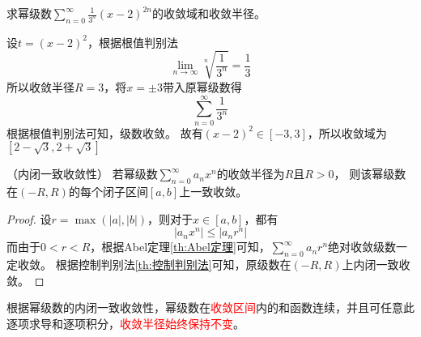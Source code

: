 \begin{example}
    求幂级数$\displaystyle \sum_{n=0}^\infty \frac{1}{3^n}(x-2)^{2n}$的收敛域和收敛半径。
\end{example}
\begin{solution}
    设$t=(x-2)^2$，根据根值判别法
    \[ \lim_{n\to\infty} \sqrt[n]{\frac{1}{3^n}}=\frac{1}{3} \]
    所以收敛半径$R=3$，将$x =\pm 3$带入原幂级数得
    \[ \sum_{n=0}^\infty \frac{1}{3^n} \]
    根据根值判别法可知，级数收敛。
    故有$(x-2)^2 \in [-3,3]$，所以收敛域为$[2-\sqrt{3},2+\sqrt{3}]$
\end{solution}

\begin{theorem}
    （内闭一致收敛性）
    \label{th:内闭一致收敛性}
    若幂级数$\displaystyle\sum_{n=0}^\infty a_nx^n$的收敛半径为$R$且$R>0$，
    则该幂级数在$(-R,R)$的每个闭子区间$[a,b]$上一致收敛。
\end{theorem}
\begin{proof}
    设$r=\max(|a|,|b|)$，则对于$x\in[a,b]$，都有
    \[ |a_nx^n| \leq |a_nr^n| \]
    而由于$0<r<R$，根据Abel定理\ref{th:Abel定理}可知，$\displaystyle\sum_{n=0}^\infty a_nr^n$绝对收敛级数一定收敛。
    根据控制判别法\ref{th:控制判别法}可知，原级数在$(-R,R)$上内闭一致收敛。
\end{proof}

根据幂级数的内闭一致收敛性，幂级数在\textcolor{red}{收敛区间}内的和函数连续，并且可任意此逐项求导和逐项积分，\textcolor{red}{收敛半径始终保持不变}。

